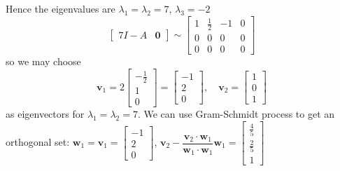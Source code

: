 \documentclass{beamer}
\theoremstyle{definition}
\theoremstyle{remark}
\begin{document}
\begin{frame}[t]
\begin{example}
Hence the eigenvalues are $\lambda_1=\lambda_2=7$, $\lambda_3=-2$\pause
\[
\left[\begin{array}{c|c}
7I-A&\mathbf0
\end{array}\right]\sim\left[\begin{array}{ccc|c}
1&\frac{1}{2}&-1&0\\
0&0&0&0\\
0&0&0&0
\end{array}\right]
\]\pause
so we may choose
\[
\mathbf v_1=2\begin{bmatrix}
-\frac{1}{2}\\1\\0
\end{bmatrix}=\begin{bmatrix}
-1\\2\\0
\end{bmatrix},\quad\mathbf v_2=\begin{bmatrix}
1\\0\\1
\end{bmatrix}
\]\pause
as eigenvectors for $\lambda_1=\lambda_2=7$. We can use Gram-Schmidt process to get an orthogonal set: $\mathbf w_1=\mathbf v_1=\begin{bmatrix}
-1\\2\\0
\end{bmatrix}$, $\mathbf v_2-\dfrac{\mathbf v_2\cdot\mathbf w_1}{\mathbf w_1\cdot\mathbf w_1}\mathbf w_1=\begin{bmatrix}
\frac{4}{5}\\\frac{2}{5}\\1
\end{bmatrix}$
\end{example}
\end{frame}
\end{document}
